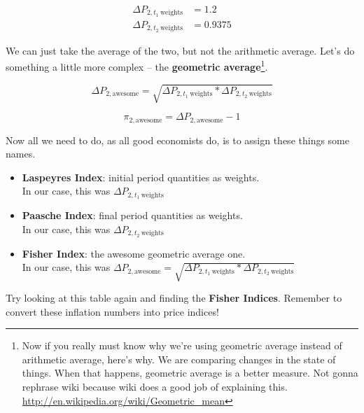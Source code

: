 \documentclass[11pt]{scrartcl}
\begin{document}
\begin{align*}
\Delta P_{2, t_1 \mathrm{\:weights}} &= 1.2 \\
\Delta P_{2, t_2 \mathrm{\:weights}} &= 0.9375
\end{align*}

We can just take the average of the two, but not the arithmetic average. Let's do something a little more complex -- the \textbf{geometric average}\footnote{Now if you really must know why we're using geometric average instead of arithmetic average, here's why. We are comparing changes in the state of things. When that happens, geometric average is a better measure. Not gonna rephrase wiki because wiki does a good job of explaining this. \url{http://en.wikipedia.org/wiki/Geometric_mean}}.

\[ \Delta P_{2, \mathrm{awesome}} = \sqrt{\Delta P_{2, t_1 \mathrm{\:weights}} * \Delta P_{2, t_2 \mathrm{\:weights}}} \]

\[ \pi_{2, \mathrm{awesome}} = \Delta P_{2, \mathrm{awesome}} - 1 \]

Now all we need to do, as all good economists do, is to assign these things some names.

\begin{itemize}
\item \textbf{Laspeyres Index}: initial period quantities as weights. \\In our case, this was $\Delta P_{2, t_1 \mathrm{\:weights}}$
\item \textbf{Paasche Index}: final period quantities as weights. \\In our case, this was $\Delta P_{2, t_2 \mathrm{\:weights}}$
\item \textbf{Fisher Index}: the awesome geometric average one. \\In our case, this was $\Delta P_{2, \mathrm{awesome}} = \sqrt{\Delta P_{2, t_1 \mathrm{\:weights}} * \Delta P_{2, t_2 \mathrm{\:weights}}}$
\end{itemize}

Try looking at this table again and finding the \textbf{Fisher Indices}. Remember to convert these inflation numbers into price indices!
\end{document}
